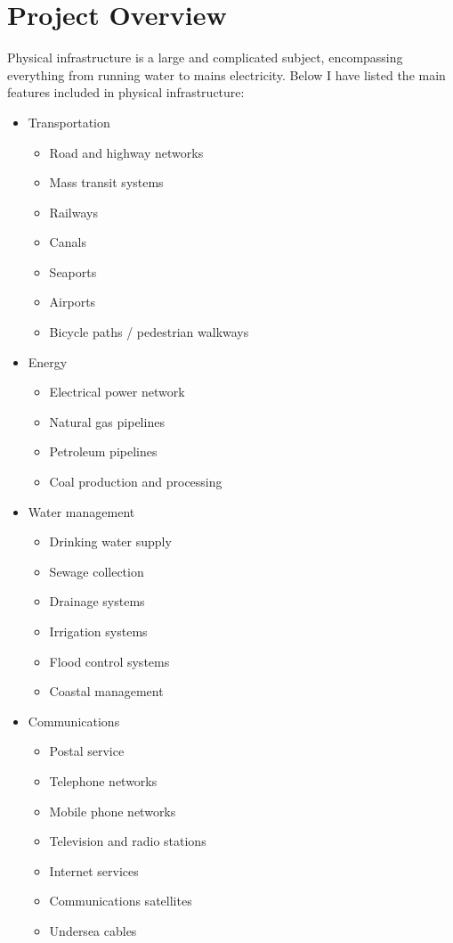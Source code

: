 \section{Project Overview}

    Physical infrastructure is a large and complicated subject, encompassing everything from running water to mains electricity. Below I have listed the main features included in physical infrastructure:

    \begin{itemize}
        \item Transportation
        \begin{itemize}
            \item Road and highway networks
            \item Mass transit systems
            \item Railways
            \item Canals
            \item Seaports
            \item Airports
            \item Bicycle paths / pedestrian walkways
        \end{itemize}

        \item Energy
        \begin{itemize}
            \item Electrical power network
            \item Natural gas pipelines
            \item Petroleum pipelines
            \item Coal production and processing
        \end{itemize}

        \item Water management
        \begin{itemize}
            \item Drinking water supply
            \item Sewage collection
            \item Drainage systems
            \item Irrigation systems
            \item Flood control systems
            \item Coastal management
        \end{itemize}

        \item Communications
        \begin{itemize}
            \item Postal service
            \item Telephone networks
            \item Mobile phone networks
            \item Television and radio stations
            \item Internet services
            \item Communications satellites
            \item Undersea cables
        \end{itemize}


\end{itemize}
